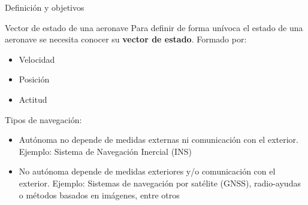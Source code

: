 \begin{frame}{Definición y objetivos}
	\begin{block}{\centering \footnotesize Vector de estado de una aeronave}
		Para definir de forma unívoca el estado de una aeronave se necesita conocer su \textbf{vector de estado}. Formado por:
		\begin{itemize}
			\item Velocidad
			\item Posición
			\item Actitud
		\end{itemize}
	\end{block}
	Tipos de navegación:
	\begin{itemize}
		\item Autónoma  no depende de medidas externas ni comunicación con el exterior. Ejemplo: Sistema de Navegación Inercial (INS)
		\item No autónoma  depende de medidas exteriores y/o comunicación con el exterior. Ejemplo: Sistemas de navegación por satélite (GNSS), radio-ayudas o métodos basados en imágenes, entre otros
	\end{itemize}
\end{frame}